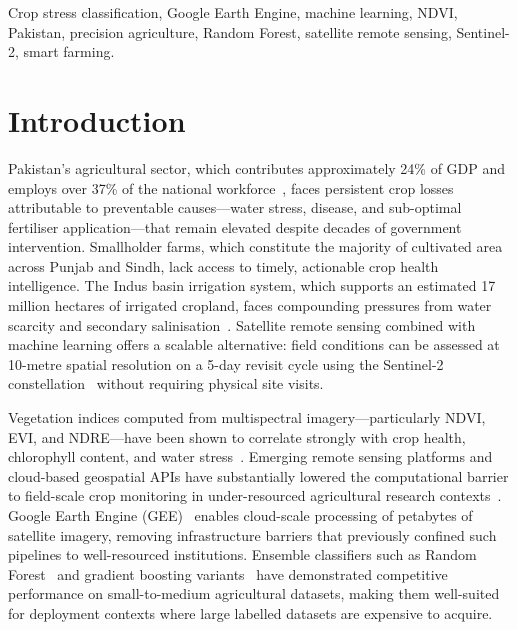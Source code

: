 \documentclass[conference]{IEEEtran}
\begin{document}
\begin{IEEEkeywords}
Crop stress classification, Google Earth Engine, machine learning, NDVI,
Pakistan, precision agriculture, Random Forest, satellite remote sensing,
Sentinel-2, smart farming.
\end{IEEEkeywords}

\section{Introduction}

Pakistan's agricultural sector, which contributes approximately 24\% of GDP and
employs over 37\% of the national workforce~\cite{pbs2024,pesurvey2025}, faces
persistent crop losses attributable to preventable causes---water stress,
disease, and sub-optimal fertiliser application---that remain elevated despite
decades of government intervention. Smallholder farms, which
constitute the majority of cultivated area across Punjab and Sindh, lack access
to timely, actionable crop health intelligence. The Indus basin irrigation
system, which supports an estimated 17 million hectares of irrigated cropland,
faces compounding pressures from water scarcity and secondary
salinisation~\cite{muzammil2020}. Satellite remote sensing combined with machine
learning offers a scalable alternative: field conditions can be assessed at
10-metre spatial resolution on a 5-day revisit cycle using the Sentinel-2
constellation~\cite{drusch2012} without requiring physical site visits.

Vegetation indices computed from multispectral imagery---particularly NDVI,
EVI, and NDRE---have been shown to correlate strongly with crop health,
chlorophyll content, and water stress~\cite{rouse1974,gitelson2002}. Emerging
remote sensing platforms and cloud-based geospatial APIs have substantially
lowered the computational barrier to field-scale crop monitoring in
under-resourced agricultural research contexts~\cite{sishodia2020}. Google
Earth Engine (GEE)~\cite{gorelick2017} enables cloud-scale processing of
petabytes of satellite imagery, removing infrastructure barriers that previously
confined such pipelines to well-resourced institutions. Ensemble classifiers
such as Random Forest~\cite{breiman2001} and gradient boosting
variants~\cite{chen2016xgboost} have demonstrated competitive performance on
small-to-medium agricultural datasets, making them well-suited for deployment
contexts where large labelled datasets are expensive to acquire.
\end{document}
